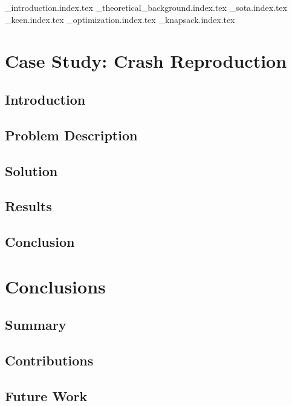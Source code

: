 \pagestyle{fancy}
{_introduction.index.tex}
{_theoretical_background.index.tex}
{_sota.index.tex}
{_keen.index.tex}
{_optimization.index.tex}
{_knapsack.index.tex}


\chapter{Case Study: Crash Reproduction}
\label{chap:beacon}
  \section{Introduction}
  \label{sec:introduction}
    \Blindtext
  \section{Problem Description}
  \label{sec:problem_description}
    \Blindtext
  \section{Solution}
  \label{sec:solution}
    \Blindtext
  \section{Results}
  \label{sec:results}
    \Blindtext
  \section{Conclusion}
  \label{sec:conclusion}
    \Blindtext

\chapter{Conclusions}
\label{chap:conclusions}
  \section{Summary}
  \label{sec:summary}
    \Blindtext
  \section{Contributions}
  \label{sec:contributions}
    \Blindtext
  \section{Future Work}
  \label{sec:future_work}
